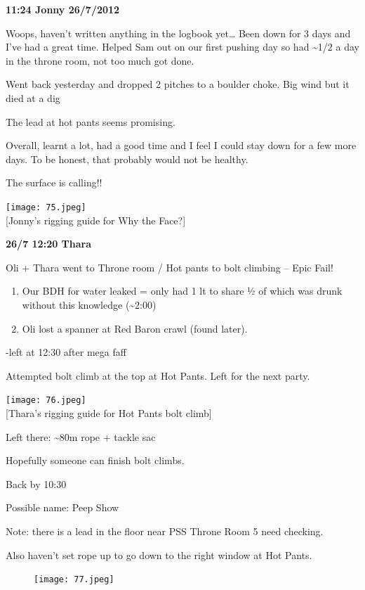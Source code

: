 \textbf{11:24 Jonny 26/7/2012}

Woops, haven't written anything in the logbook yet\ldots{} Been down for
3 days and I've had a great time. Helped Sam out on our first pushing
day so had \textasciitilde{}1/2 a day in the throne room, not too much
got done.

Went back yesterday and dropped 2 pitches to a boulder choke. Big wind
but it died at a dig

The lead at hot pants seems promising.

Overall, learnt a lot, had a good time and I feel I could stay down for
a few more days. To be honest, that probably would not be healthy.

The surface is calling!!

\texttt{[image: 75.jpeg]}\\
{[}Jonny's rigging guide for Why the Face?{]}

\textbf{26/7 12:20 Thara}

Oli + Thara went to Throne room / Hot pants to bolt climbing -- Epic
Fail!

\begin{enumerate}
\def\labelenumi{\arabic{enumi}.}
\tightlist
\item
  Our BDH for water leaked = only had 1 lt to share ½ of which was drunk
  without this knowledge (\textasciitilde{}2:00)
\item
  Oli lost a spanner at Red Baron crawl (found later).
\end{enumerate}

-left at 12:30 after mega faff

Attempted bolt climb at the top at Hot Pants. Left for the next party.

\texttt{[image: 76.jpeg]}\\
{[}Thara's rigging guide for Hot Pants bolt climb{]}

Left there: \textasciitilde{}80m rope + tackle sac

Hopefully someone can finish bolt climbs.

Back by 10:30

Possible name: Peep Show

Note: there is a lead in the floor near PSS Throne Room 5 need checking.

Also haven't set rope up to go down to the right window at Hot Pants.

\begin{figure}[htbp]
\centering
\texttt{[image: 77.jpeg]}
\caption{}
\end{figure}

